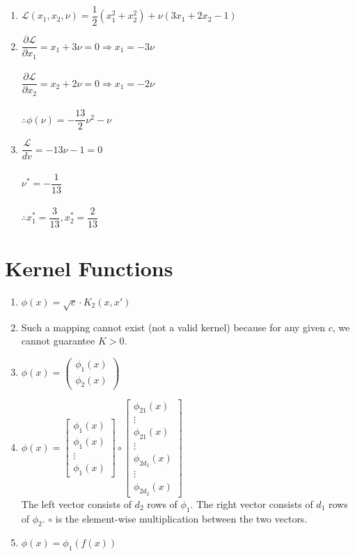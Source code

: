 \documentclass[english]{article}
\begin{document}
\begin{enumerate}
	\item 
	${\mathcal{L}}(x_1,x_2,\nu) = \boxed{\dfrac{1}{2}(x_1^2+x_2^2) + \nu(3x_1+2x_2-1)}$
	\item 
	$\dfrac{\partial \mathcal{L}}{\partial x_1} = x_1 + 3\nu = 0 \Rightarrow x_1 = -3\nu$\\\\
    $\dfrac{\partial \mathcal{L}}{\partial x_2} = x_2 + 2\nu = 0 \Rightarrow x_1 = -2\nu$\\\\
	$\therefore \phi(\nu) = \boxed{-\dfrac{13}{2}\nu^2-\nu}$
	\item 
	$\dfrac{\mathcal{L}}{dv} = -13\nu-1=0$\\\\
	$\nu^*= -\dfrac{1}{13}$\\\\
	$\therefore x_1^* = \boxed{\dfrac{3}{13}},  x_2^* =\boxed{\dfrac{2}{13}}$
\end{enumerate}
\clearpage

\section{Kernel Functions}

\begin{enumerate}
\item $\phi(x) = \boxed{\sqrt{c}\cdot K_2(x, x')}$
\item Such a mapping cannot exist (not a valid kernel) because for any given $c$, we cannot guarantee $K>0$.
\item $\phi(x) = \boxed{\left(\begin{array}{c}
      \phi_1(x) \\
      \phi_2(x)
    \end{array}\right)}$
\item $\phi(x) = \boxed{\left[\begin{array}{c}
      \phi_1(x) \\
      \phi_1(x) \\
      \vdots\\
      \phi_1(x)
    \end{array}\right] \circ \left[\begin{array}{c}
      \phi_{21}(x) \\
      \vdots\\
      \phi_{21}(x) \\
      \vdots\\
      \phi_{2d_2}(x)\\
      \vdots\\
      \phi_{2d_2}(x)
    \end{array}\right]}$\\
    The left vector consists of $d_2$ rows of $\phi_1$. The right vector consists of $d_1$ rows of $\phi_2$. $\circ$ is the element-wise multiplication between the two vectors.
\item $\phi(x) = \boxed{\phi_1(f(x))}$
\end{enumerate}
\clearpage
\end{document}
